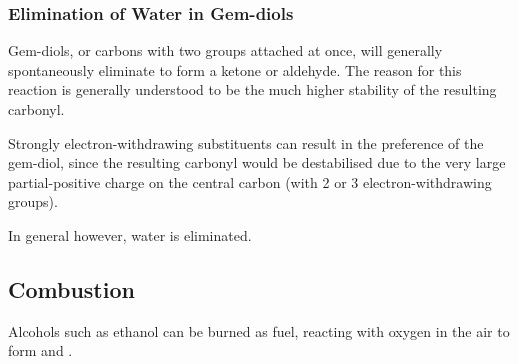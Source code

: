 
			\pagebreak
			\subsubsection{Elimination of Water in Gem-diols}

				Gem-diols, or carbons with two  groups attached at once, will generally spontaneously eliminate  to form a
				ketone or aldehyde. The reason for this reaction is generally understood to be the much higher stability of the resulting
				carbonyl.

				Strongly electron-withdrawing substituents can result in the preference of the gem-diol, since the resulting carbonyl
				would be destabilised due to the very large partial-positive charge on the central carbon (with 2 or 3 electron-withdrawing groups).

				In general however, water is eliminated.



		\pagebreak
		\subsection{Combustion}

			Alcohols such as ethanol can be burned as fuel, reacting with oxygen in the air to form  and .




